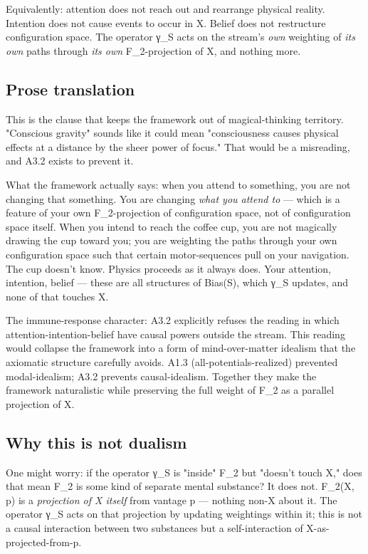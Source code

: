 \documentclass[11pt, openany]{book}
\begin{document}
Equivalently: attention does not reach out and rearrange physical reality. Intention does not cause events to occur in X. Belief does not restructure configuration space. The operator γ\_\allowbreak{}S acts on the stream's \textit{own} weighting of \textit{its own} paths through \textit{its own} F\_\allowbreak{}2-projection of X, and nothing more.

\subsection{Prose translation}

This is the clause that keeps the framework out of magical-thinking territory. "Conscious gravity" sounds like it could mean "consciousness causes physical effects at a distance by the sheer power of focus." That would be a misreading, and A3.2 exists to prevent it.

What the framework actually says: when you attend to something, you are not changing that something. You are changing \textit{what you attend to} --- which is a feature of your own F\_\allowbreak{}2-projection of configuration space, not of configuration space itself. When you intend to reach the coffee cup, you are not magically drawing the cup toward you; you are weighting the paths through your own configuration space such that certain motor-sequences pull on your navigation. The cup doesn't know. Physics proceeds as it always does. Your attention, intention, belief --- these are all structures of Bias(S), which γ\_\allowbreak{}S updates, and none of that touches X.

The immune-response character: A3.2 explicitly refuses the reading in which attention-intention-belief have causal powers outside the stream. This reading would collapse the framework into a form of mind-over-matter idealism that the axiomatic structure carefully avoids. A1.3 (all-potentials-realized) prevented modal-idealism; A3.2 prevents causal-idealism. Together they make the framework naturalistic while preserving the full weight of F\_\allowbreak{}2 as a parallel projection of X.

\subsection{Why this is not dualism}

One might worry: if the operator γ\_\allowbreak{}S is "inside" F\_\allowbreak{}2 but "doesn't touch X," does that mean F\_\allowbreak{}2 is some kind of separate mental substance? It does not. F\_\allowbreak{}2(X, p) is a \textit{projection of X itself} from vantage p --- nothing non-X about it. The operator γ\_\allowbreak{}S acts on that projection by updating weightings within it; this is not a causal interaction between two substances but a self-interaction of X-as-projected-from-p.
\end{document}
